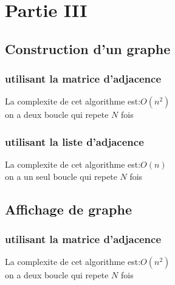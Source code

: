 \documentclass{report}
\begin{document}
\newpage
\section{Partie III}

\subsection{Construction d'un graphe}
\subsubsection{utilisant la matrice d'adjacence}
La complexite de cet algorithme est:\(O(n^{2})\)\\
on a deux boucle qui repete \(N\) fois

\begin{algorithm}
\caption{}
\end{algorithm}

\subsubsection{utilisant la liste d'adjacence}

La complexite de cet algorithme est:\(O(n)\)\\
on a un seul boucle qui repete \(N\) fois
\begin{algorithm}
\caption{}
\end{algorithm}
\newpage
\subsection{Affichage de graphe}

\subsubsection{utilisant la matrice d'adjacence}
La complexite de cet algorithme est:\(O(n^{2})\)\\
on a deux boucle qui repete \(N\) fois
\begin{algorithm}
\caption{}
\end{algorithm}
\end{document}
